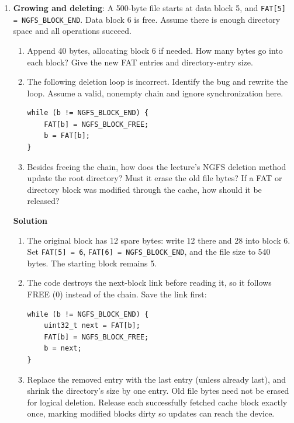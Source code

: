 \documentclass{article}
\newenvironment{solution}{\par\medskip\noindent\textbf{Solution}\par\smallskip}{\par}
\begin{document}
\begin{enumerate}
\newpage
\item \textbf{Growing and deleting}: A 500-byte file starts at data block 5,
and \texttt{FAT[5] = NGFS\_BLOCK\_END}. Data block 6 is free. Assume there
is enough directory space and all operations succeed.
\begin{enumerate}
\item Append 40 bytes, allocating block 6 if needed. How many bytes go into
each block? Give the new FAT entries and directory-entry size.
\item The following deletion loop is incorrect. Identify the bug and rewrite
the loop. Assume a valid, nonempty chain and ignore synchronization here.
\begin{lstlisting}[style=CStyle]
while (b != NGFS_BLOCK_END) {
    FAT[b] = NGFS_BLOCK_FREE;
    b = FAT[b];
}
\end{lstlisting}
\item Besides freeing the chain, how does the lecture's NGFS deletion method
update the root directory? Must it erase the old file bytes? If a FAT or
directory block was modified through the cache, how should it be released?
\end{enumerate}
\begin{solution}
\begin{enumerate}
\item The original block has 12 spare bytes: write 12 there and 28 into
block 6. Set \texttt{FAT[5] = 6}, \texttt{FAT[6] = NGFS\_BLOCK\_END},
and the file size to 540 bytes. The starting block remains 5.
\item The code destroys the next-block link before reading it, so it follows
FREE (0) instead of the chain. Save the link first:
\begin{lstlisting}[style=CStyle]
while (b != NGFS_BLOCK_END) {
    uint32_t next = FAT[b];
    FAT[b] = NGFS_BLOCK_FREE;
    b = next;
}
\end{lstlisting}
\item Replace the removed entry with the last entry (unless already last),
and shrink the directory's size by one entry. Old file bytes need not be
erased for logical deletion. Release each successfully fetched cache block
exactly once, marking modified blocks dirty so updates can reach the device.
\end{enumerate}
\end{solution}
\end{enumerate}
\end{document}
